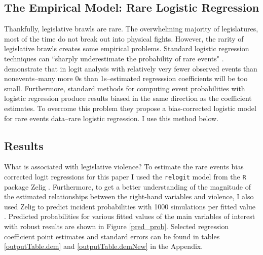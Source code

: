 \documentclass[a4paper]{article}\usepackage{graphicx, color}
\begin{document}
\subsection{The Empirical Model: Rare Logistic Regression}

Thankfully, legislative brawls are rare. The overwhelming majority of legislatures, most of the time do not break out into physical fights. However, the rarity of legislative brawls creates some empirical problems. Standard logistic regression techniques can ``sharply underestimate the probability of rare events" \cite[137]{KingRareEventsPA2001}. \cite{KingRareEventsPA2001} demonstrate that in logit analysis with relatively very fewer observed events than nonevents--many more 0s than 1s--estimated regresssion coefficients will be too small. Furthermore, standard methods for computing event probabilities with logistic regression produce results biased in the same direction as the coefficient estimates. To overcome this problem they propose a bias-corrected logistic model for rare events data--rare logistic regression. I use this method below.



\subsection{Results}

What is associated with legislative violence? To estimate the rare events bias corrected logit regressions for this paper I used the {\tt{relogit}} model from the {\tt{R}} package Zelig \citep{IMAIKingZelig2008}. Furthermore, to get a better understanding of the magnitude of the estimated relationships between the right-hand variables and violence, I also used Zelig to predict incident probabilities with 1000 simulations per fitted value \citep[see][]{King2002}. Predicted probabilities for various fitted values of the main variables of interest with robust results are shown in Figure \ref{pred_prob}. Selected regression coefficient point estimates and standard errors can be found in tables \ref{outputTable.dem} and \ref{outputTable.demNew} in the Appendix. 
\end{document}

